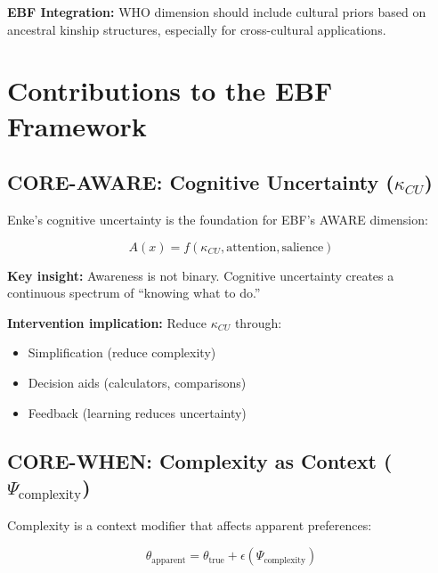 \textbf{EBF Integration:} WHO dimension should include cultural priors based
on ancestral kinship structures, especially for cross-cultural applications.


\section{Contributions to the EBF Framework}
\label{sec:enk-ebf}

\subsection{CORE-AWARE: Cognitive Uncertainty ($\kappa_{CU}$)}

Enke's cognitive uncertainty is the foundation for EBF's AWARE dimension:

\begin{equation}
A(x) = f(\kappa_{CU}, \text{attention}, \text{salience})
\end{equation}

\textbf{Key insight:} Awareness is not binary. Cognitive uncertainty creates
a continuous spectrum of ``knowing what to do.''

\textbf{Intervention implication:} Reduce $\kappa_{CU}$ through:
\begin{itemize}[nosep]
    \item Simplification (reduce complexity)
    \item Decision aids (calculators, comparisons)
    \item Feedback (learning reduces uncertainty)
\end{itemize}

\subsection{CORE-WHEN: Complexity as Context ($\Psi_{\text{complexity}}$)}

Complexity is a context modifier that affects apparent preferences:

\begin{equation}
\theta_{\text{apparent}} = \theta_{\text{true}} + \epsilon(\Psi_{\text{complexity}})
\end{equation}

